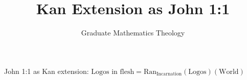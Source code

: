 \documentclass{article}
\begin{document}
\title{Kan Extension as John 1:1}
\author{Graduate Mathematics Theology}
\maketitle

\begin{theorem}

John 1:1 as Kan extension:
$\text{Logos in flesh} = \mathrm{Ran}_{\text{Incarnation}}(\text{Logos})(\text{World})$
            
\end{theorem}
\end{document}
